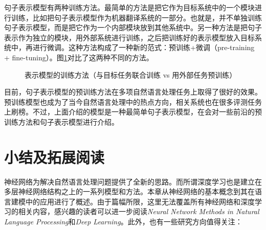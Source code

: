 \parinterval  句子表示模型有两种训练方法。最简单的方法是把它作为目标系统中的一个模块进行训练，比如把句子表示模型作为机器翻译系统的一部分。也就是，并不单独训练句子表示模型，而是把它作为一个内部模块放到其他系统中。另一种方法是把句子表示作为独立的模块，用外部系统进行训练，之后把训练好的表示模型放入目标系统中，再进行微调。这种方法构成了一种新的范式：预训练+微调（pre-training + fine-tuning）。图\ref{fig:9-69}对比了这两种不同的方法。

\begin{figure}[htp]
\centering

\caption{表示模型的训练方法（与目标任务联合训练 vs 用外部任务预训练）}
\label{fig:9-69}
\end{figure}

\parinterval  目前，句子表示模型的预训练方法在多项自然语言处理任务上取得了很好的效果。预训练模型也成为了当今自然语言处理中的热点方向，相关系统也在很多评测任务上刷榜。不过，上面介绍的模型是一种最简单句子表示模型，在{\chaptersixteen}会对一些前沿的预训练方法和句子表示模型进行介绍。


\sectionnewpage
\section{小结及拓展阅读}

\parinterval  神经网络为解决自然语言处理问题提供了全新的思路。而所谓深度学习也是建立在多层神经网络结构之上的一系列模型和方法。本章从神经网络的基本概念到其在语言建模中的应用进行了概述。由于篇幅所限，这里无法覆盖所有神经网络和深度学习的相关内容，感兴趣的读者可以进一步阅读\textit{Neural Network Methods in Natural Language Processing}和\textit{Deep Learning}。此外，也有一些研究方向值得关注：

